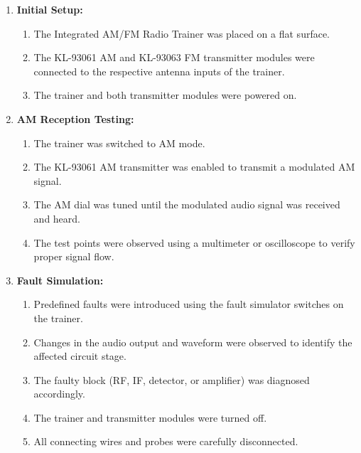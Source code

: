 \documentclass[a4paper,12pt]{article}
\begin{document}
	\begin{enumerate}
		\item \textbf{Initial Setup:}
		\begin{enumerate}
			\item The Integrated AM/FM Radio Trainer was placed on a flat surface.
			\item The KL-93061 AM and KL-93063 FM transmitter modules were connected to the respective antenna inputs of the trainer.
			\item The trainer and both transmitter modules were powered on.
		\end{enumerate}
		
		\item \textbf{AM Reception Testing:}
		\begin{enumerate}
			\item The trainer was switched to AM mode.
			\item The KL-93061 AM transmitter was enabled to transmit a modulated AM signal.
			\item The AM dial was tuned until the modulated audio signal was received and heard.
			\item The test points were observed using a multimeter or oscilloscope to verify proper signal flow.
		\end{enumerate}
		
		\item \textbf{Fault Simulation:}
		\begin{enumerate}
			\item Predefined faults were introduced using the fault simulator switches on the trainer.
			\item Changes in the audio output and waveform were observed to identify the affected circuit stage.
			\item The faulty block (RF, IF, detector, or amplifier) was diagnosed accordingly.
			
			
			
			\item The trainer and transmitter modules were turned off.
			\item All connecting wires and probes were carefully disconnected.
		\end{enumerate}
	\end{enumerate}
	
\end{document}

